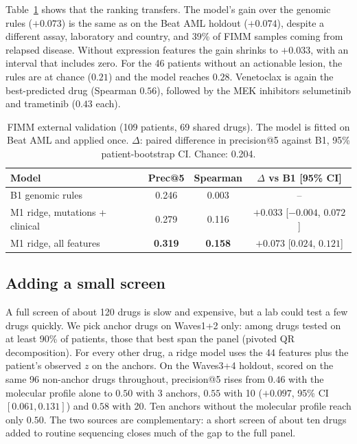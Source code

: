 \documentclass[11pt,logo,nonumbering]{preprint}
\newcommand{\z}{z}
\begin{document}
Table~\ref{tab:fimm} shows that the ranking transfers. The model's gain over the genomic rules ($+0.073$) is the same as on the Beat AML holdout ($+0.074$), despite a different assay, laboratory and country, and 39\% of FIMM samples coming from relapsed disease. Without expression features the gain shrinks to $+0.033$, with an interval that includes zero. For the 46 patients without an actionable lesion, the rules are at chance ($0.21$) and the model reaches $0.28$. Venetoclax is again the best-predicted drug (Spearman $0.56$), followed by the MEK inhibitors selumetinib and trametinib ($0.43$ each).

\begin{table}[ht]
\small
\centering
\caption{FIMM external validation (109 patients, 69 shared drugs). The model is fitted on Beat AML and applied once. $\Delta$: paired difference in precision@5 against B1, 95\% patient-bootstrap CI. Chance: 0.204.}
\label{tab:fimm}
\begin{tabular}{@{}lccc@{}}
\toprule
Model & Prec@5 & Spearman & $\Delta$ vs B1 [95\% CI]\\
\midrule
B1 genomic rules & 0.246 & 0.003 & --\\
M1 ridge, mutations + clinical & 0.279 & 0.116 & $+0.033$ [$-0.004$, $0.072$]\\
\rowcolor{lightblue} M1 ridge, all features & \textbf{0.319} & \textbf{0.158} & $+0.073$ [$0.024$, $0.121$]\\
\bottomrule
\end{tabular}
\end{table}

\subsection{Adding a small screen}
A full screen of about 120 drugs is slow and expensive, but a lab could test a few drugs quickly. We pick anchor drugs on Waves1+2 only: among drugs tested on at least 90\% of patients, those that best span the panel (pivoted QR decomposition). For every other drug, a ridge model uses the 44 features plus the patient's observed $\z$ on the anchors. On the Waves3+4 holdout, scored on the same 96 non-anchor drugs throughout, precision@5 rises from $0.46$ with the molecular profile alone to $0.50$ with 3 anchors, $0.55$ with 10 ($+0.097$, 95\% CI $[0.061, 0.131]$) and $0.58$ with 20. Ten anchors without the molecular profile reach only $0.50$. The two sources are complementary: a short screen of about ten drugs added to routine sequencing closes much of the gap to the full panel.
\end{document}
